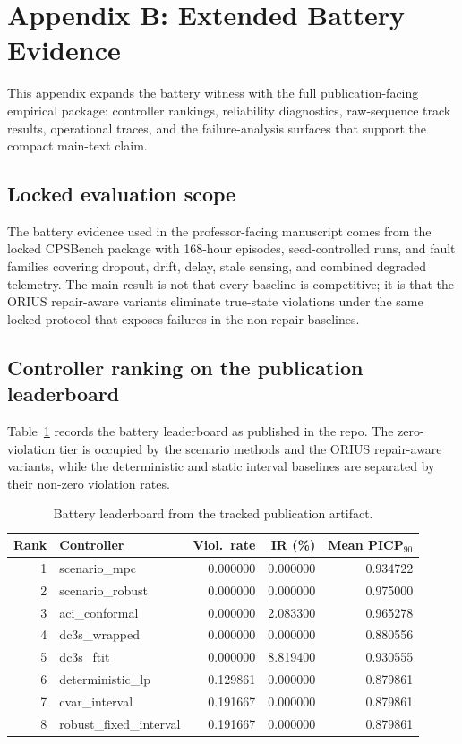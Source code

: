 \section{Appendix B: Extended Battery Evidence}
\label{app:prof-battery-empirical}

This appendix expands the battery witness with the full publication-facing
empirical package: controller rankings, reliability diagnostics, raw-sequence
track results, operational traces, and the failure-analysis surfaces that
support the compact main-text claim.

\subsection{Locked evaluation scope}
The battery evidence used in the professor-facing manuscript comes from the
locked CPSBench package with 168-hour episodes, seed-controlled runs, and fault
families covering dropout, drift, delay, stale sensing, and combined degraded
telemetry.  The main result is not that every baseline is competitive; it is
that the ORIUS repair-aware variants eliminate true-state violations under the
same locked protocol that exposes failures in the non-repair baselines.

\subsection{Controller ranking on the publication leaderboard}
Table~\ref{tab:prof-battery-leaderboard} records the battery leaderboard as
published in the repo.  The zero-violation tier is occupied by the scenario
methods and the ORIUS repair-aware variants, while the deterministic and static
interval baselines are separated by their non-zero violation rates.

\begin{table}[t]
\centering
\small
\caption{Battery leaderboard from the tracked publication artifact.}
\label{tab:prof-battery-leaderboard}
\begin{tabular}{rlrrr}
\toprule
\textbf{Rank} & \textbf{Controller} & \textbf{Viol.\ rate} & \textbf{IR (\%)} & \textbf{Mean PICP$_{90}$} \\
\midrule
1 & scenario\_mpc & 0.000000 & 0.000000 & 0.934722 \\
2 & scenario\_robust & 0.000000 & 0.000000 & 0.975000 \\
3 & aci\_conformal & 0.000000 & 2.083300 & 0.965278 \\
4 & dc3s\_wrapped & 0.000000 & 0.000000 & 0.880556 \\
5 & dc3s\_ftit & 0.000000 & 8.819400 & 0.930555 \\
6 & deterministic\_lp & 0.129861 & 0.000000 & 0.879861 \\
7 & cvar\_interval & 0.191667 & 0.000000 & 0.879861 \\
8 & robust\_fixed\_interval & 0.191667 & 0.000000 & 0.879861 \\
\bottomrule
\end{tabular}
\end{table}

